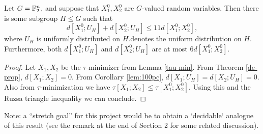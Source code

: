 \begin{theorem}\label{entropy-pfr}
  \leanok
  Let $G = \mathbb{F}_2^n$, and suppose that $X^0_1, X^0_2$ are $G$-valued random variables.
  Then there is some subgroup $H \leq G$ such that
  \[
    d[X^0_1;U_H] + d[X^0_2;U_H] \le 11 d[X^0_1;X^0_2],
  \]
  where $U_H$ is uniformly distributed on $H$.denotes the uniform distribution on $H$.
  Furthermore, both $d[X^0_1;U_H]$ and $d[X^0_2;U_H]$ are at most $6 d[X^0_1;X^0_2]$.
\end{theorem}

\begin{proof}   Let $X_1, X_2$ be the $\tau$-minimizer from Lemma \ref{tau-min}.  From Theorem \ref{de-prop}, $d[X_1;X_2]=0$.  From Corollary \ref{lem:100pc}, $d[X_1;U_H] = d[X_2; U_H] = 0$.  Also from $\tau$-minimization we have $\tau[X_1;X_2] \leq \tau[X^0_1;X^0_2]$.  Using this and the Ruzsa triangle inequality we can conclude.
\end{proof}

Note: a ``stretch goal'' for this project would be to obtain a `decidable` analogue of this result (see the remark at the end of Section 2 for some related discussion).
